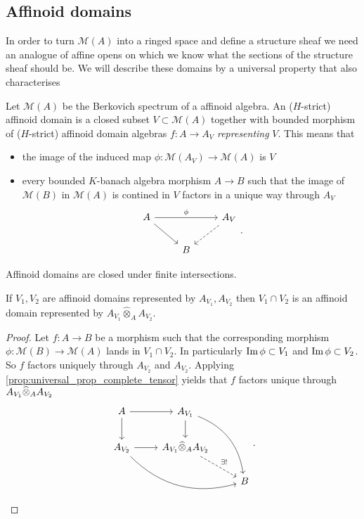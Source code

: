 \subsection{Affinoid domains} \label{sec:affinoid_domains}

In order to turn $\mathcal{M} (A)$ into a ringed space and define a structure sheaf we need an analogue of affine opens on which we know what the sections of the structure sheaf should be. 
We will describe these domains by a universal property that also characterises 

\begin{definition}
	Let $\mathcal{M} (A)$ be the Berkovich spectrum of a affinoid algebra. 
	An ($H$-strict) affinoid domain is a closed subset $V \subset  \mathcal{M} (A)$ together with bounded morphism of ($H$-strict) affinoid domain algebras $f:A \to A_V$ \emph{representing} $V$.
	This means that 
	\begin{itemize}
		\item the image of the induced map $\phi:\mathcal{M} (A_V) \to \mathcal{M} (A)$ is $V$ 
		\item every bounded $K$-banach algebra morphism $A \to B$ such that the image of $\mathcal{M} (B)$ in $\mathcal{M} (A)$ is contined in $V$ factors in a unique way through $A_V$ \[
	\begin{tikzcd}
		A \ar{rr}{\phi} \ar{dr}& & A_V \ar[dashed]{dl} \\
				& B
	\end{tikzcd}
	.\] 
	\end{itemize}
\end{definition}

Affinoid domains are closed under finite intersections. 
\begin{lemma}\label{lem:intersection_affinoid_domain}
	If $V_1, V_2$ are affinoid domains represented by $A_{V_1}, A_{V_2}$ then $V_1 \cap V_2$ is an affinoid domain represented by $A_{V_1} \widehat\otimes_A A_{V_2}$. 
\end{lemma}
\begin{proof}
	Let $f: A \to B$ be a morphism such that the corresponding morphism  $\phi: \mathcal{M} (B) \to \mathcal{M}(A) $ lands in $V_1 \cap V_2$. In particularly $\operatorname{Im} \phi \subset  V_1$ and $\operatorname{Im} \phi \subset V_2$. 
	So $f$ factors uniquely through $A_{V_2}$ and $A_{V_2}$.
	Applying \cref{prop:universal_prop_complete_tensor} yields that  $f$ factors unique through $A_{V_1} \widehat{\otimes}_A A_{V_2}$ 
	\[
	\begin{tikzcd}
		A \rar \dar & A_{V_1} \dar \ar[bend left]{rdd} \\
		A_{V_2} \rar \ar[bend right]{drr} &  A_{V_1} \cox_A A_{V_2} \ar[dashed]{dr}{\exists !} \\
		 & & B
	\end{tikzcd}
	.\] 
\end{proof}

